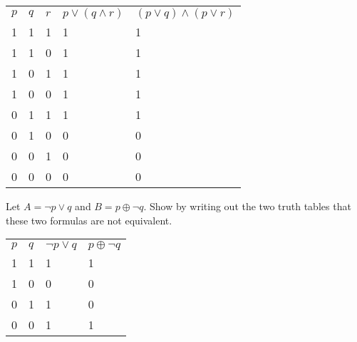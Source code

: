 \documentclass[solution, letterpaper]{cs20}
\begin{document}
        \begin{solution}

        \begin{table}[h]
        \centering
        \label{my-label}
        \begin{tabular}{lllll}
        $p$ & $q$ & $r$ & $p \lor (q \land r)$ & $(p \lor q) \land (p \lor r)$ \\
        1 & 1 & 1 & 1                    & 1                           \\
        1 & 1 & 0 & 1                    & 1                           \\
        1 & 0 & 1 & 1                    & 1                           \\
        1 & 0 & 0 & 1                    & 1                           \\
        0 & 1 & 1 & 1                    & 1                           \\
        0 & 1 & 0 & 0                    & 0                           \\
        0 & 0 & 1 & 0                    & 0                           \\
        0 & 0 & 0 & 0                    & 0
        \end{tabular}
        \end{table}

        \end{solution}

        \problem{}{} Let $A = \neg p \lor q$ and $B = p \oplus \neg q$. Show by writing out the two truth tables that these two formulas are not equivalent.

        \begin{solution}
        \begin{table}[h]
        \centering
        \label{my-label}
        \begin{tabular}{llll}
        $p$ & $q$ & $\neg p \lor q$ & $p \oplus \neg q$ \\
        1   & 1   & 1               & 1                 \\
        1   & 0   & 0               & 0                 \\
        0   & 1   & 1               & 0                 \\
        0   & 0   & 1               & 1
        \end{tabular}
        \end{table}
        \end{solution}
\end{document}

